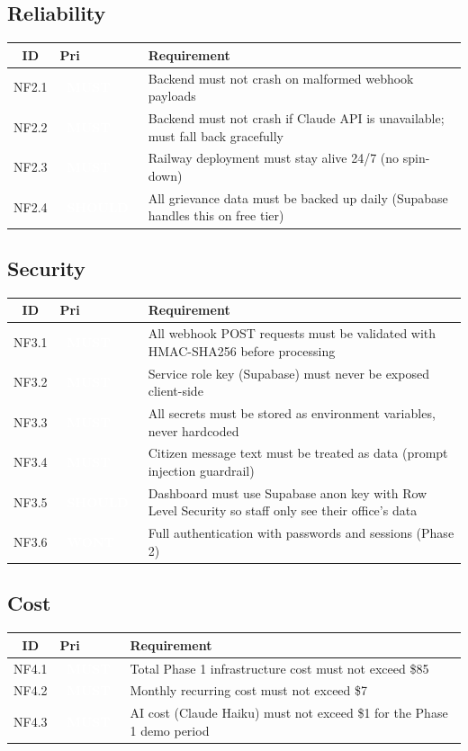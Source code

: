 \documentclass[11pt, a4paper]{article}
\newcommand{\must}{\textcolor{white}{\colorbox{mustcol}{\textbf{\ MUST\ }}}}
\newcommand{\should}{\textcolor{white}{\colorbox{shouldcol}{\textbf{\ SHOULD\ }}}}
\newcommand{\wont}{\textcolor{white}{\colorbox{wontcol}{\textbf{\ WONT\ }}}}
\begin{document}
\subsection{Reliability}

\begin{tabularx}{\linewidth}{clX}
\toprule
\textbf{ID} & \textbf{Pri} & \textbf{Requirement} \\
\midrule
NF2.1 & \must   & Backend must not crash on malformed webhook payloads \\
NF2.2 & \must   & Backend must not crash if Claude API is unavailable; must fall back gracefully \\
NF2.3 & \must   & Railway deployment must stay alive 24/7 (no spin-down) \\
NF2.4 & \should & All grievance data must be backed up daily (Supabase handles this on free tier) \\
\bottomrule
\end{tabularx}

\subsection{Security}

\begin{tabularx}{\linewidth}{clX}
\toprule
\textbf{ID} & \textbf{Pri} & \textbf{Requirement} \\
\midrule
NF3.1 & \must   & All webhook POST requests must be validated with HMAC-SHA256 before processing \\
NF3.2 & \must   & Service role key (Supabase) must never be exposed client-side \\
NF3.3 & \must   & All secrets must be stored as environment variables, never hardcoded \\
NF3.4 & \must   & Citizen message text must be treated as data (prompt injection guardrail) \\
NF3.5 & \should & Dashboard must use Supabase anon key with Row Level Security so staff only see their office's data \\
NF3.6 & \wont   & Full authentication with passwords and sessions (Phase 2) \\
\bottomrule
\end{tabularx}

\subsection{Cost}

\begin{tabularx}{\linewidth}{clX}
\toprule
\textbf{ID} & \textbf{Pri} & \textbf{Requirement} \\
\midrule
NF4.1 & \must   & Total Phase 1 infrastructure cost must not exceed \$85 \\
NF4.2 & \must   & Monthly recurring cost must not exceed \$7 \\
NF4.3 & \must   & AI cost (Claude Haiku) must not exceed \$1 for the Phase 1 demo period \\
\bottomrule
\end{tabularx}
\end{document}
